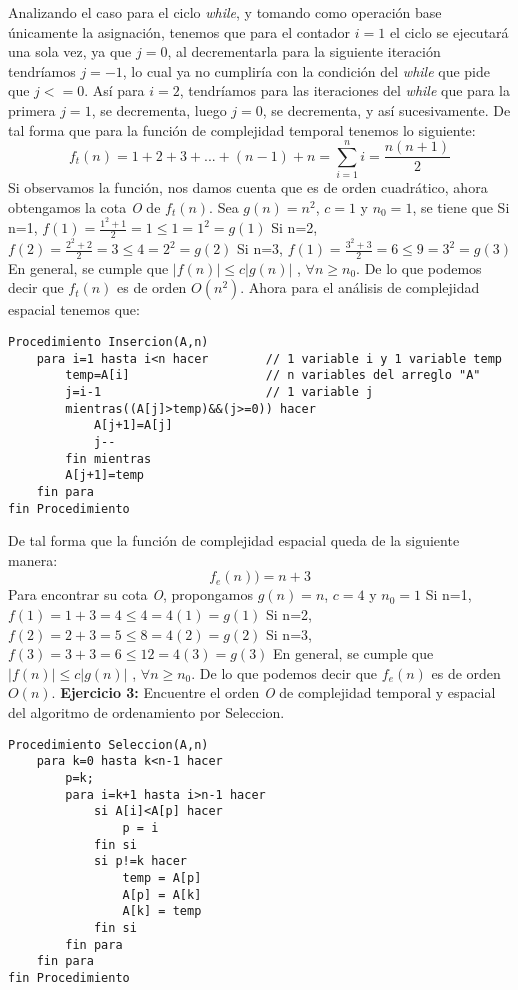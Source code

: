\documentclass[12pt, letterpaper, twoside]{article}
\begin{document}
Analizando el caso para el ciclo \textit{while}, y tomando como operación base únicamente la asignación, tenemos que para el contador $i=1$ el ciclo se ejecutará una sola vez, ya que $j=0$, al decrementarla para la siguiente iteración tendríamos $j=-1$, lo cual ya no cumpliría con la condición del \textit{while} que pide que $j<=0$. Así para $i=2$, tendríamos para las iteraciones del \textit{while} que para la primera $j=1$, se decrementa, luego $j=0$, se decrementa, y así sucesivamente.\newline
De tal forma que para la función de complejidad temporal tenemos lo siguiente:
\[f_{t}(n)=1+2+3+...+(n-1)+n=\sum_{i=1}^{n}i=\frac{n(n+1)}{2}\]
Si observamos la función, nos damos cuenta que es de orden cuadrático, ahora obtengamos la cota \textit{O} de $f_{t}(n)$.\newline
Sea $g(n)=n^{2}$, $c=1$ y $n_{0}=1$, se tiene que\newline
Si n=1,
\center$f(1)=\frac{1^{2}+1}{2}=1\leq 1=1^{2}=g(1)$
\justify
Si n=2,
\center$f(2)=\frac{2^{2}+2}{2}=3\leq 4=2^{2}=g(2)$
\justify
Si n=3,
\center$f(1)=\frac{3^{2}+3}{2}=6\leq 9=3^{2}=g(3)$
\justify
En general, se cumple que
\center$|f(n)|\leq c|g(n)|$ , $\forall n\geq n_{0}$.
\justify
De lo que podemos decir que $f_{t}(n)$ es de orden $O(n^{2})$.\newline
Ahora para el análisis de complejidad espacial tenemos que:
\begin{lstlisting}
Procedimiento Insercion(A,n)
	para i=1 hasta i<n hacer		// 1 variable i	y 1 variable temp
		temp=A[i]					// n variables del arreglo "A"
		j=i-1						// 1 variable j
		mientras((A[j]>temp)&&(j>=0)) hacer    
			A[j+1]=A[j]				
 			j--						
		fin mientras
		A[j+1]=temp					
	fin para
fin Procedimiento
\end{lstlisting}
De tal forma que la función de complejidad espacial queda de la siguiente manera:
\[f_{e}(n))=n+3\]
Para encontrar su cota \textit{O}, propongamos $g(n)=n$, $c=4$ y $n_{0}=1$\newline
Si n=1,
\center$f(1)=1+3=4\leq 4=4(1)=g(1)$
\justify
Si n=2,
\center$f(2)=2+3=5\leq 8=4(2)=g(2)$
\justify
Si n=3,
\center$f(3)=3+3=6\leq 12=4(3)=g(3)$
\justify
En general, se cumple que
\center$|f(n)|\leq c|g(n)|$ , $\forall n\geq n_{0}$.
\justify
De lo que podemos decir que $f_{e}(n)$ es de orden $O(n)$.
\newpage
\textbf{Ejercicio 3:} Encuentre el orden \textit{O} de complejidad temporal y espacial
del algoritmo de ordenamiento por Seleccion.
\begin{lstlisting}
Procedimiento Seleccion(A,n)
	para k=0 hasta k<n-1 hacer
		p=k;
		para i=k+1 hasta i>n-1 hacer
			si A[i]<A[p] hacer
				p = i
			fin si
			si p!=k hacer
				temp = A[p]
				A[p] = A[k]
				A[k] = temp
			fin si
		fin para
	fin para
fin Procedimiento
\end{lstlisting}
\end{document}
